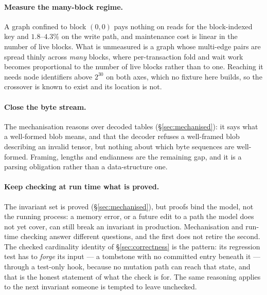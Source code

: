 \documentclass[11pt,a4paper]{article}
\theoremstyle{plain}
\theoremstyle{definition}
\theoremstyle{remark}
\begin{document}
\paragraph{Measure the many-block regime.} A graph confined to block $(0,0)$ pays
nothing on reads for the block-indexed key and $1.8$--$4.3\%$ on the write path,
and maintenance cost is linear in the number of live blocks. What is unmeasured
is a graph whose multi-edge pairs are spread thinly across \emph{many} blocks,
where per-transaction fold and wait work becomes proportional to the number of
live blocks rather than to one. Reaching it needs node identifiers above
$2^{30}$ on both axes, which no fixture here builds, so the crossover is known to
exist and its location is not.

\paragraph{Close the byte stream.} The mechanisation reasons over decoded tables
(\S\ref{sec:mechanised}): it says what a well-formed blob means, and that the
decoder refuses a well-framed blob describing an invalid tensor, but nothing
about which byte sequences are well-formed. Framing, lengths and endianness are
the remaining gap, and it is a parsing obligation rather than a data-structure
one.

\paragraph{Keep checking at run time what is proved.} The invariant set is proved
(\S\ref{sec:mechanised}), but proofs bind the model, not the running process: a
memory error, or a future edit to a path the model does not yet cover, can still
break an invariant in production. Mechanisation and run-time checking answer
different questions, and the first does not retire the second. The checked
cardinality identity of \S\ref{sec:correctness} is the pattern: its regression
test has to \emph{forge} its input --- a tombstone with no committed entry beneath
it --- through a test-only hook, because no mutation path can reach that state,
and that is the honest statement of what the check is for. The same reasoning
applies to the next invariant someone is tempted to leave unchecked.
\end{document}
